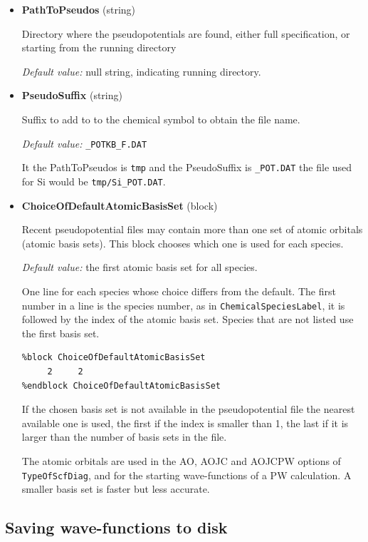 \documentclass[11pt]{article}
\begin{document}
\begin{itemize}

\item{\bf PathToPseudos} (string)

  Directory where the pseudopotentials are found, either full specification,
  or starting from the running directory

  \textit{Default value:}  null string, indicating running directory.


\item{\bf PseudoSuffix} (string)

  Suffix to add to to the chemical symbol to obtain the file name.

  \textit{Default value:}  \texttt{{\_}POTKB{\_}F.DAT}

  It the PathToPseudos is \texttt{tmp} and the PseudoSuffix is \texttt{{\_}POT.DAT}
  the file used for Si would be \texttt{tmp/Si{\_}POT.DAT}.

\item{\bf ChoiceOfDefaultAtomicBasisSet} (block)

  Recent pseudopotential files may contain more than one set of atomic orbitals
  (atomic basis sets).  This block chooses which one is used for each species.

  \textit{Default value:}  the first atomic basis set for all species.

  One line for each species whose choice differs from the default.
  The first number in a line is the species number, as in
  \texttt{ChemicalSpeciesLabel}, it is followed by the index of the atomic basis set.
  Species that are not listed use the first basis set.
\begin{verbatim}
%block ChoiceOfDefaultAtomicBasisSet
     2     2
%endblock ChoiceOfDefaultAtomicBasisSet
\end{verbatim}
  If the chosen basis set is not available in the pseudopotential file
  the nearest available one is used, the first if the index is smaller than 1, the last
  if it is larger than the number of basis sets in the file.

  The atomic orbitals are used in the AO, AOJC and AOJCPW options of
  \texttt{TypeOfScfDiag}, and for the starting wave-functions of a PW calculation.
  A smaller basis set is faster but less accurate.

\end{itemize}


\subsection{Saving wave-functions to disk}
\end{document}
